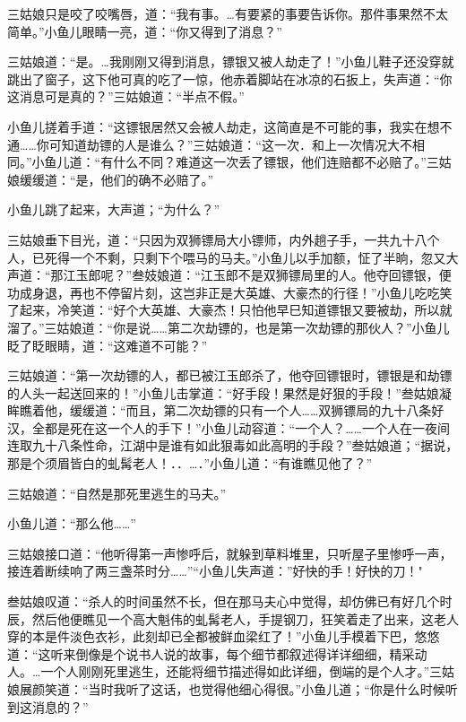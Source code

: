 \documentclass[12pt,oneside]{book}
\begin{document}
三姑娘只是咬了咬嘴唇，道：``我有事。\ldots 有要紧的事要告诉你。那件事果然不太简单。''小鱼儿眼睛一亮，道：``你又得到了消息？''

三姑娘道：``是。\ldots 我刚刚又得到消息，镖银又被人劫走了！''小鱼儿鞋子还没穿就跳出了窗子，这下他可真的吃了一惊，他赤着脚站在冰凉的石扳上，失声道：``你这消息可是真的？''三姑娘道：``半点不假。''

小鱼儿搓着手道：``这镖银居然又会被人劫走，这简直是不可能的事，我实在想不通\ldots\ldots 你可知道劫镖的人是谁么？''三姑娘道：``这一次．和上一次情况大不相同。''小鱼儿道：``有什么不同？难道这一次丢了镖银，他们连赔都不必赔了。''三姑娘缓缓道：``是，他们的确不必赔了。''

小鱼儿跳了起来，大声道；``为什么？''

三姑娘垂下目光，道：``只因为双狮镖局大小镖师，内外趟子手，一共九十八个人，已死得一个不剩，只剩下个喂马的马夫。''小鱼儿以手加额，怔了半晌，忽又大声道：``那江玉郎呢？''叁妓娘道：``江玉郎不是双狮镖局里的人。他夺回镖银，便功成身退，再也不停留片刻，这岂非正是大英雄、大豪杰的行径！''小鱼儿吃吃笑了起来，冷笑道：``好个大英雄、大豪杰！只怕他早巳知道镖银又要被劫，所以就溜了。''三姑娘道：``你是说\ldots\ldots 第二次劫镖的，也是第一次劫镖的那伙人？''小鱼儿眨了眨眼睛，道：``这难道不可能？''

三姑娘道：``第一次劫镖的人，都已被江玉郎杀了，他夺回镖银时，镖银是和劫镖的人头一起送回来的！''小鱼儿击掌道：``好手段！果然是好狠的手段！''叁姑娘凝眸瞧着他，缓缓道：``而且，第二次劫镖的只有一个人\ldots\ldots 双狮镖局的九十八条好汉，全都是死在这一个人的手下！''小鱼儿动容道：``一个人？\ldots\ldots 一个人在一夜间连取九十八条性命，江湖中是谁有如此狠毒如此高明的手段？''叁姑娘道；``据说，那是个须眉皆白的虬髯老人！．．\ldots．''小鱼儿道：``有谁瞧见他了？''

三姑娘道：``自然是那死里逃生的马夫。''

小鱼儿道：``那么他\ldots\ldots{}''

三姑娘接口道：``他听得第一声惨呼后，就躲到草料堆里，只听屋子里惨呼一声，接连着断续响了两三盏茶时分\ldots\ldots{}''``小鱼儿失声道：''好快的手！好快的刀！"

叁姑娘叹道：``杀人的时间虽然不长，但在那马夫心中觉得，却仿佛已有好几个时辰，然后他便瞧见一个高大魁伟的虬髯老人，手提钢刀，狂笑着走了出来，这老人穿的本是件淡色衣衫，此刻却已全都被鲜血梁红了！''小鱼儿手模着下巴，悠悠道：``这听来倒像是个说书人说的故事，每个细节都叙述得详详细细，精采动人。\ldots 一个人刚刚死里逃生，还能将细节描述得如此详细，倒端的是个人才。''三姑娘展颜笑道：``当时我听了这话，也觉得他细心得很。''小鱼儿道；``你是什么时候听到这消息的？''
\end{document}
